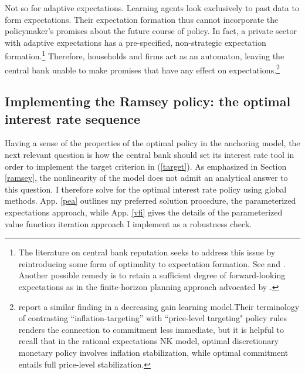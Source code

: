 \documentclass[11pt]{article}
\renewcommand{\[}{\begin{equation}}
\renewcommand{\]}{\end{equation}}
\begin{document}
Not so for adaptive expectations. Learning agents look exclusively to past data to form expectations. Their expectation formation thus cannot incorporate the policymaker's promises about the future course of policy. In fact, a private sector with adaptive expectations has a pre-specified, non-strategic expectation formation.\footnote{The literature on central bank reputation seeks to address this issue by reintroducing some form of optimality to expectation formation. See \cite{cho1995induction} and \cite{ireland2000expectations}. Another possible remedy is to retain a sufficient degree of forward-looking expectations as in the finite-horizon planning approach advocated by \cite{woodford2019monetary}.}  Therefore, households and firms act as an automaton, leaving the central bank unable to make promises that have any effect on expectations.\footnote{\cite{mele2019perils} report a similar finding in a decreasing gain learning model.Their terminology of contrasting ``inflation-targeting'' with ``price-level targeting" policy rules renders the connection to commitment less immediate, but it is helpful to recall that in the rational expectations NK model, optimal discretionary monetary policy involves inflation stabilization, while optimal commitment entails full price-level stabilization.} 


\subsection{Implementing the Ramsey policy: the optimal interest rate sequence}\label{implement}
Having a sense of the properties of the optimal policy in the anchoring model, the next relevant question is how the central bank should set its interest rate tool in order to implement the target criterion in (\ref{target}). As emphasized in Section \ref{ramsey}, the nonlinearity of the model does not admit an analytical answer to this question. I therefore solve for the optimal interest rate policy using global methods. App. \ref{pea} outlines my preferred solution procedure, the parameterized expectations approach, while App. \ref{vfi} gives the details of the parameterized value function iteration approach I implement as a robustness check. 
\end{document}
